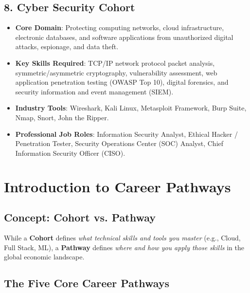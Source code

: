 \subsection{8. Cyber Security Cohort}
\begin{itemize}[leftmargin=1.5em]
    \item \textbf{Core Domain}: Protecting computing networks, cloud infrastructure, electronic databases, and software applications from unauthorized digital attacks, espionage, and data theft.
    \item \textbf{Key Skills Required}: TCP/IP network protocol packet analysis, symmetric/asymmetric cryptography, vulnerability assessment, web application penetration testing (OWASP Top 10), digital forensics, and security information and event management (SIEM).
    \item \textbf{Industry Tools}: Wireshark, Kali Linux, Metasploit Framework, Burp Suite, Nmap, Snort, John the Ripper.
    \item \textbf{Professional Job Roles}: Information Security Analyst, Ethical Hacker / Penetration Tester, Security Operations Center (SOC) Analyst, Chief Information Security Officer (CISO).
\end{itemize}

\section{Introduction to Career Pathways}

\subsection{Concept: Cohort vs. Pathway}

\begin{keyequation}
While a \textbf{Cohort} defines \textit{what technical skills and tools you master} (e.g., Cloud, Full Stack, ML), a \textbf{Pathway} defines \textit{where and how you apply those skills} in the global economic landscape.
\end{keyequation}

\subsection{The Five Core Career Pathways}

